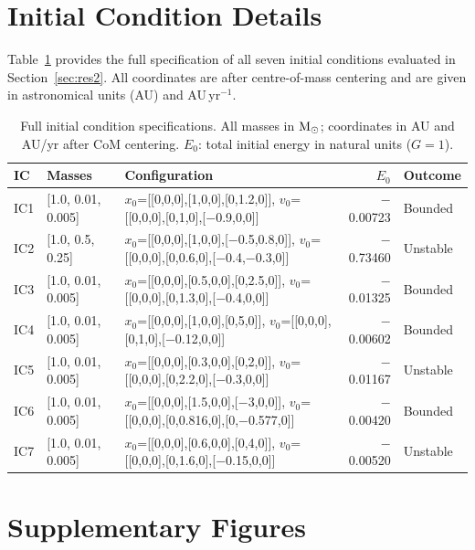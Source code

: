 \documentclass[12pt]{article}
\begin{document}
\appendix
\section{Initial Condition Details}
\label{app:ics}

Table~\ref{tab:ic_details} provides the full specification of all seven initial conditions
evaluated in Section~\ref{sec:res2}. All coordinates are after centre-of-mass centering
and are given in astronomical units (AU) and AU\,yr$^{-1}$.

\begin{table}[H]
\centering
\caption{Full initial condition specifications. All masses in $\rm M_\odot$; coordinates in
AU and AU/yr after CoM centering. $E_0$: total initial energy in natural units ($G=1$).}
\label{tab:ic_details}
\small
\begin{tabular}{lllrl}
\toprule
\textbf{IC} & \textbf{Masses} & \textbf{Configuration} & \textbf{$E_0$} & \textbf{Outcome} \\
\midrule
IC1 & [1.0, 0.01, 0.005] & $x_0$=[[0,0,0],[1,0,0],[0,1.2,0]], $v_0$=[[0,0,0],[0,1,0],[$-$0.9,0,0]] & $-$0.00723 & Bounded \\
IC2 & [1.0, 0.5, 0.25]   & $x_0$=[[0,0,0],[1,0,0],[$-$0.5,0.8,0]], $v_0$=[[0,0,0],[0,0.6,0],[$-$0.4,$-$0.3,0]] & $-$0.73460 & Unstable \\
IC3 & [1.0, 0.01, 0.005] & $x_0$=[[0,0,0],[0.5,0,0],[0,2.5,0]], $v_0$=[[0,0,0],[0,1.3,0],[$-$0.4,0,0]] & $-$0.01325 & Bounded \\
IC4 & [1.0, 0.01, 0.005] & $x_0$=[[0,0,0],[1,0,0],[0,5,0]], $v_0$=[[0,0,0],[0,1,0],[$-$0.12,0,0]] & $-$0.00602 & Bounded \\
IC5 & [1.0, 0.01, 0.005] & $x_0$=[[0,0,0],[0.3,0,0],[0,2,0]], $v_0$=[[0,0,0],[0,2.2,0],[$-$0.3,0,0]] & $-$0.01167 & Unstable \\
IC6 & [1.0, 0.01, 0.005] & $x_0$=[[0,0,0],[1.5,0,0],[$-$3,0,0]], $v_0$=[[0,0,0],[0,0.816,0],[0,$-$0.577,0]] & $-$0.00420 & Bounded \\
IC7 & [1.0, 0.01, 0.005] & $x_0$=[[0,0,0],[0.6,0,0],[0,4,0]], $v_0$=[[0,0,0],[0,1.6,0],[$-$0.15,0,0]] & $-$0.00520 & Unstable \\
\bottomrule
\end{tabular}
\end{table}

\section{Supplementary Figures}
\label{app:figs}
\end{document}
